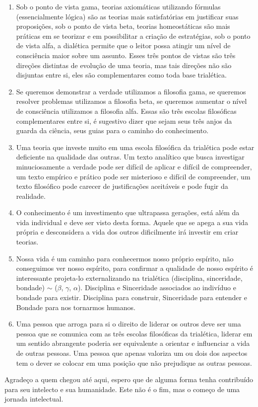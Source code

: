 \documentclass[10pt,a4paper]{report}
\begin{document}
\begin{enumerate}
	\item Sob o ponto de vista gama, teorias axiomáticas utilizando fórmulas (essencialmente lógica) são as teorias mais satisfatórias em justificar suas proposições, sob o ponto de vista beta, teorias homeostáticas são mais práticas em se teorizar e em possibilitar a criação de estratégias, sob o ponto de vista alfa, a dialética permite que o leitor possa atingir um nível de consciência maior sobre um assunto. Esses três pontos de vistas são três direções distintas de evolução de uma teoria, mas tais direções não são disjuntas entre si, eles são complementares como toda base trialética.
	\item Se queremos demonstrar a verdade utilizamos a filosofia gama, se queremos resolver problemas utilizamos a filosofia beta, se queremos aumentar o nível de consciência utilizamos a filosofia alfa. Essas são três escolas filosóficas complementares entre si, é sugestivo dizer que sejam seus três anjos da guarda da ciência, seus guias para o caminho do conhecimento.
	\item Uma teoria que investe muito em uma escola filosófica da trialética pode estar deficiente na qualidade das outras. Um texto analítico que busca investigar minuciosamente a verdade pode ser difícil de aplicar e difícil de compreender, um texto empírico e prático pode ser misterioso e difícil de compreender, um texto filosófico pode carecer de justificações aceitáveis e pode fugir da realidade.
	\item O conhecimento é um investimento que ultrapassa gerações, está além da vida individual e deve ser visto desta forma. Aquele que se apega a sua vida própria e desconsidera a vida dos outros dificilmente irá investir em criar teorias.
	\item Nossa vida é um caminho para conhecermos nosso próprio espírito, não conseguimos ver nosso espírito, para confirmar a qualidade de nosso espírito é interessante projeta-lo externalizando na trialética (disciplina, sinceridade, bondade) $\sim$ ($\beta$, $\gamma$, $\alpha$). Disciplina e Sinceridade associados ao indivíduo e bondade para existir. Disciplina para construir, Sinceridade para entender e Bondade para nos tornarmos humanos.
	\item Uma pessoa que arroga para si o direito de liderar os outros deve ser uma pessoa que se comunica com as três escolas filosóficas da trialética, liderar em um sentido abrangente poderia ser equivalente a orientar e influenciar a vida de outras pessoas. Uma pessoa que apenas valoriza um ou dois dos aspectos tem o dever se colocar em uma posição que não prejudique as outras pessoas.
\end{enumerate}

Agradeço a quem chegou até aqui, espero que de alguma forma tenha contribuído para seu intelecto e sua humanidade. Este não é o fim, mas o começo de uma jornada intelectual.

\end{document}
